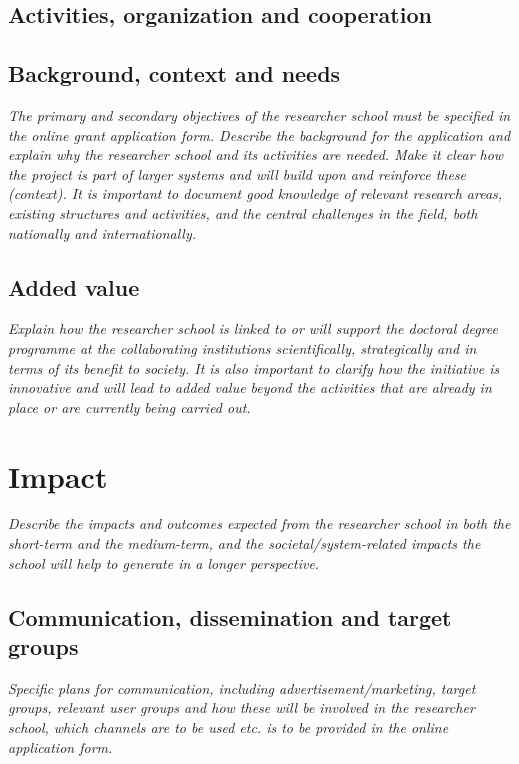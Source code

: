 \documentclass{scrreprt}
\begin{document}
\subsection{Activities, organization and cooperation}


\subsection{Background, context and needs}

{\em The primary and secondary objectives of the researcher school must be
specified in the online grant application form.  Describe the
background for the application and explain why the researcher school
and its activities are needed. Make it clear how the project is part
of larger systems and will build upon and reinforce these
(context). It is important to document good knowledge of relevant
research areas, existing structures and activities, and the central
challenges in the field, both nationally and internationally.}




\subsection{Added value}

{\em Explain how the researcher school is linked to or will support the
doctoral degree programme at the collaborating institutions
scientifically, strategically and in terms of its benefit to
society. It is also important to clarify how the initiative is
innovative and will lead to added value beyond the activities that are
already in place or are currently being carried out.}

\section{Impact}


{\em Describe the impacts and outcomes expected from the researcher school
in both the short-term and the medium-term, and the
societal/system-related impacts the school will help to generate in a
longer perspective.}

\subsection{Communication, dissemination and target groups}

{\em Specific plans for communication, including advertisement/marketing,
target groups, relevant user groups and how these will be involved in
the researcher school, which channels are to be used etc. is to be
provided in the online application form.}
\end{document}
